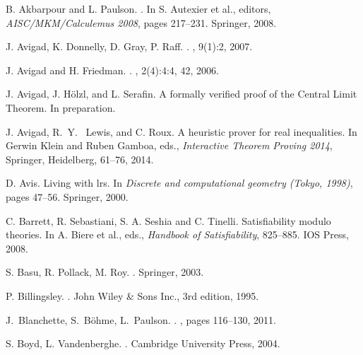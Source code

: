 \documentclass[runningheds]{llncs}
\begin{document}
\def\cprime{}
\begin{thebibliography}{10}

B. Akbarpour and L. Paulson.
.
\newblock In S. Autexier et al., editors, {\em {AISC/MKM/Calculemus 2008}}, pages 217--231. Springer, 2008.

J. Avigad, K. Donnelly, D. Gray,  P. Raff.
.
, 9(1):2, 2007.



J. Avigad and H. Friedman.
.
, 2(4):4:4, 42, 2006.

J. Avigad, J. H\"olzl, and L. Serafin.
\newblock A formally verified proof of the Central Limit Theorem.
\newblock In preparation.

J. Avigad, R.~Y.~ Lewis, and C. Roux.
\newblock A heuristic prover for real inequalities.
\newblock  In Gerwin Klein and Ruben Gamboa, eds., {\em Interactive Theorem Proving 2014}, Springer, Heidelberg, 61--76, 2014. 

D. Avis.
\newblock Living with lrs.
\newblock In {\em Discrete and computational geometry ({T}okyo, 1998)}, pages 47--56. Springer, 
  2000.

C. Barrett, R. Sebastiani, S. A. Seshia and C. Tinelli.
\newblock Satisﬁability modulo theories.
\newblock In A. Biere et al., eds., {\em Handbook of Satisﬁability}, 825--885. IOS Press, 2008.

S. Basu, R. Pollack,  M. Roy.
.
\newblock Springer, 2003.

P. Billingsley.
.
\newblock John Wiley \& Sons Inc., 3rd edition, 1995.

J.~Blanchette, S.~B\"{o}hme,  L.~Paulson.
.
, pages 116--130, 2011.

S.\! Boyd, L.\! Vandenberghe.
.
\newblock Cambridge University Press, 2004.


\end{thebibliography}
\end{document}
